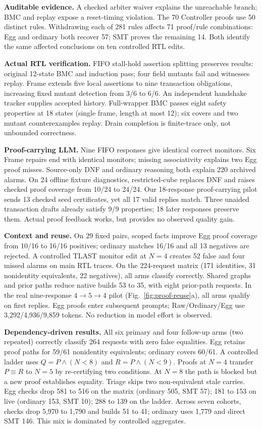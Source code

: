 \documentclass[conference,10pt,letterpaper]{IEEEtran}
\begin{document}
\textbf{Auditable evidence.} A checked arbiter waiver explains the unreachable branch; BMC and replay expose a reset-timing violation. The 70 Controller proofs use 50 distinct rules. Withdrawing each of 281 rules affects 71 proof/rule combinations: Egg and ordinary both recover 57; SMT proves the remaining 14. Both identify the same affected conclusions on ten controlled RTL edits.

\textbf{Actual RTL verification.} FIFO stall-hold assertion splitting preserves results: original 12-state BMC and induction pass; four field mutants fail and witnesses replay. Frame extends five local assertions to nine transaction obligations, increasing fixed mutant detection from 3/6 to 6/6. An independent handshake tracker supplies accepted history. Full-wrapper BMC passes eight safety properties at 18 states (single frame, length at most 12); six covers and two mutant counterexamples replay. Drain completion is finite-trace only, not unbounded correctness.

\textbf{Proof-carrying LLM.} Nine FIFO responses give identical correct monitors. Six Frame repairs end with identical monitors; missing associativity explains two Egg proof misses. Source-only DNF and ordinary reasoning both explain 220 archived alarms. On 24 offline fixture diagnostics, restricted-cube replaces DNF and raises checked proof coverage from 10/24 to 24/24. Our 18-response proof-carrying pilot sends 13 checked seed certificates, yet all 17 valid replies match. Three unaided transaction drafts already satisfy 9/9 properties; 18 later responses preserve them. Actual proof feedback works, but provides no observed quality gain.

\textbf{Context and reuse.} On 29 fixed pairs, scoped facts improve Egg proof coverage from 10/16 to 16/16 positives; ordinary matches 16/16 and all 13 negatives are rejected. A controlled TLAST monitor edit at $N=4$ creates 52 false and four missed alarms on main RTL traces. On the 224-request matrix (171 identities, 31 nonidentity equivalents, 22 negatives), all arms classify correctly. Shared graphs and prior paths reduce native builds 53 to 35, with eight prior-path requests. In the real nine-response $4\!\to\!5\!\to\!4$ pilot (Fig.~\ref{fig:proof-reuse}a), all arms qualify on first replies. Egg proofs enter subsequent prompts; Raw/Ordinary/Egg use 3,292/4,936/9,859 tokens. No reduction in model effort is observed.

\textbf{Dependency-driven results.} All six primary and four follow-up arms (two repeated) correctly classify 264 requests with zero false equalities. Egg retains proof paths for 59/61 nonidentity equivalents; ordinary covers 60/61. A controlled ladder uses $Q=P\land(N<8)$ and $R=P\land(N<9)$. Proofs at $N=4$ transfer $P\equiv R$ to $N=5$ by re-certifying two conditions. At $N=8$ the path is blocked but a new proof establishes equality. Triage skips two non-equivalent stale carries. Egg checks drop 581 to 516 on the matrix (ordinary 505, SMT 57); 181 to 153 on live (ordinary 153, SMT 10); 288 to 139 on the ladder. Across seven cohorts, checks drop 5,970 to 1,790 and builds 51 to 41; ordinary uses 1,779 and direct SMT 146. This mix is dominated by controlled aggregates.
\end{document}

